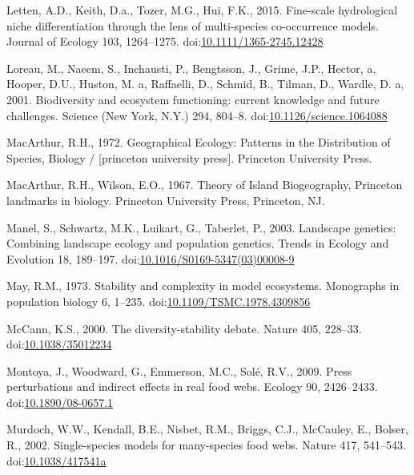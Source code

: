 \hypertarget{ref-Letten2015}{}
Letten, A.D., Keith, D.a., Tozer, M.G., Hui, F.K., 2015. Fine-scale
hydrological niche differentiation through the lens of multi-species
co-occurrence models. Journal of Ecology 103, 1264--1275.
doi:\href{https://doi.org/10.1111/1365-2745.12428}{10.1111/1365-2745.12428}

\hypertarget{ref-Loreau2001}{}
Loreau, M., Naeem, S., Inchausti, P., Bengtsson, J., Grime, J.P.,
Hector, a, Hooper, D.U., Huston, M. a, Raffaelli, D., Schmid, B.,
Tilman, D., Wardle, D. a, 2001. Biodiversity and ecosystem functioning:
current knowledge and future challenges. Science (New York, N.Y.) 294,
804--8.
doi:\href{https://doi.org/10.1126/science.1064088}{10.1126/science.1064088}

\hypertarget{ref-macarthur1972geographical}{}
MacArthur, R.H., 1972. Geographical Ecology: Patterns in the
Distribution of Species, Biology / {[}princeton university press{]}.
Princeton University Press.

\hypertarget{ref-MacArthur1967}{}
MacArthur, R.H., Wilson, E.O., 1967. Theory of Island Biogeography,
Princeton landmarks in biology. Princeton University Press, Princeton,
NJ.

\hypertarget{ref-Manel2003}{}
Manel, S., Schwartz, M.K., Luikart, G., Taberlet, P., 2003. Landscape
genetics: Combining landscape ecology and population genetics. Trends in
Ecology and Evolution 18, 189--197.
doi:\href{https://doi.org/10.1016/S0169-5347(03)00008-9}{10.1016/S0169-5347(03)00008-9}

\hypertarget{ref-May1973}{}
May, R.M., 1973. Stability and complexity in model ecosystems.
Monographs in population biology 6, 1--235.
doi:\href{https://doi.org/10.1109/TSMC.1978.4309856}{10.1109/TSMC.1978.4309856}

\hypertarget{ref-McCann2000}{}
McCann, K.S., 2000. The diversity-stability debate. Nature 405, 228--33.
doi:\href{https://doi.org/10.1038/35012234}{10.1038/35012234}

\hypertarget{ref-Montoya2009}{}
Montoya, J., Woodward, G., Emmerson, M.C., Solé, R.V., 2009. Press
perturbations and indirect effects in real food webs. Ecology 90,
2426--2433.
doi:\href{https://doi.org/10.1890/08-0657.1}{10.1890/08-0657.1}

\hypertarget{ref-Murdoch2002}{}
Murdoch, W.W., Kendall, B.E., Nisbet, R.M., Briggs, C.J., McCauley, E.,
Bolser, R., 2002. Single-species models for many-species food webs.
Nature 417, 541--543.
doi:\href{https://doi.org/10.1038/417541a}{10.1038/417541a}

